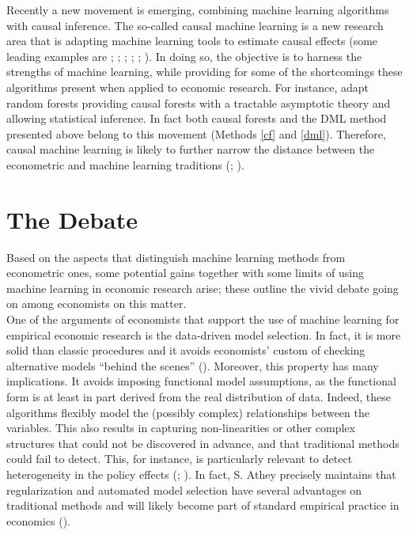 \documentclass[12pt,a4paper,openright,twoside]{book}
\begin{document}
\begin{doublespacing}
Recently a new movement is emerging, combining machine learning algorithms with causal inference. The so-called causal machine learning is a new research area that is adapting machine learning tools to estimate causal effects (some leading examples are \citealp{atheyimbens2015}; \citealp{atheyimbens2016}; \citealp{atheytibishirani}; \citealp{rulensem}; \citealp{chernozhukov2018double}; \citealp{wagerathey2018}). In doing so, the objective is to harness the strengths of machine learning, while providing for some of the shortcomings these algorithms present when applied to economic research. For instance, \citet{wagerathey2018} adapt random forests providing causal forests with a tractable asymptotic theory and allowing statistical inference. In fact both causal forests and the DML method presented above belong to this movement (Methods \ref{cf} and \ref{dml}). Therefore, causal machine learning is likely to further narrow the distance between the econometric and machine learning traditions (\citealp{athey2019}; \citealp{lechner2023}).


\section{The Debate} \label{deb}

Based on the aspects that distinguish machine learning methods from econometric ones, some potential gains together with some limits of using machine learning in economic research arise; these outline the vivid debate going on among economists on this matter. \\

One of the arguments of economists that support the use of machine learning for empirical economic research is the data-driven model selection. In fact, it is more solid than classic procedures and it avoids economists' custom of checking alternative models ``behind the scenes'' (\citealp{athey2019}). Moreover, this property has many implications. 
It avoids imposing functional model assumptions, as the functional form is at least in part derived from the real distribution of data. Indeed, these algorithms flexibly model the (possibly complex) relationships between the variables. This also results in capturing non-linearities or other complex structures that could not be discovered in advance, and that traditional methods could fail to detect. This, for instance, is particularly relevant to detect heterogeneity in the policy effects (\citealp{bankarticle}; \citealp{mullainathanetal}).
In fact, S. Athey precisely maintains that regularization and automated model selection have several advantages on traditional methods and will likely become part of standard empirical practice in economics (\citealp{athey2019}).


\end{doublespacing}
\end{document}
